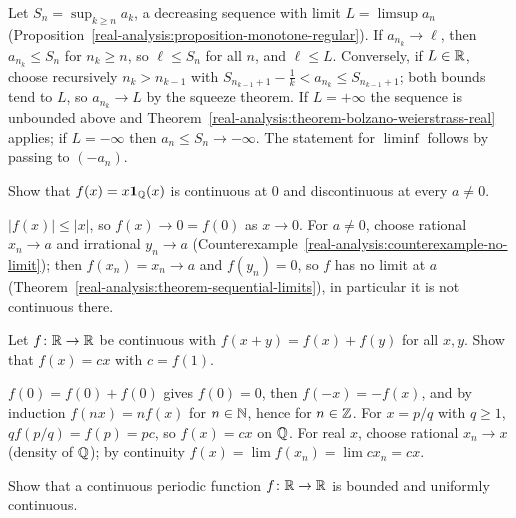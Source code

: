 \begin{solution}
Let $S_n = \sup_{k \geq n}a_k$, a decreasing sequence with limit $L = \limsup a_n$ (Proposition~\ref{real-analysis:proposition-monotone-regular}). If $a_{n_k} \to \ell$, then $a_{n_k} \leq S_n$ for $n_k \geq n$, so $\ell \leq S_n$ for
all $n$, and $\ell \leq L$. Conversely, if $L \in \mathbb{R}$, choose recursively $n_k > n_{k-1}$ with $S_{n_{k-1}+1} - \frac1k < a_{n_k} \leq S_{n_{k-1}+1}$; both bounds tend to $L$, so $a_{n_k} \to L$ by the squeeze theorem. If
$L = +\infty$ the sequence is unbounded above and Theorem~\ref{real-analysis:theorem-bolzano-weierstrass-real} applies; if $L = -\infty$ then $a_n \leq S_n \to -\infty$. The statement for $\liminf$ follows by passing to
$(-a_n)$.
\end{solution}

\begin{exercise}\label{real-analysis:exercise-continuous-one-point}
Show that $f(x) = x\mathbf{1}_{\mathbb{Q}}(x)$ is continuous at $0$ and discontinuous at every $a \neq 0$.
\end{exercise}

\begin{solution}
$|f(x)| \leq |x|$, so $f(x) \to 0 = f(0)$ as $x \to 0$. For $a \neq 0$, choose rational $x_n \to a$ and irrational $y_n \to a$ (Counterexample~\ref{real-analysis:counterexample-no-limit}); then $f(x_n) = x_n \to a$ and
$f(y_n) = 0$, so $f$ has no limit at $a$ (Theorem~\ref{real-analysis:theorem-sequential-limits}), in particular it is not continuous there.
\end{solution}

\begin{exercise}\label{real-analysis:exercise-cauchy-functional}
Let $f \colon \mathbb{R} \to \mathbb{R}$ be continuous with $f(x + y) = f(x) + f(y)$ for all $x, y$. Show that $f(x) = cx$ with $c = f(1)$.
\end{exercise}

\begin{solution}
$f(0) = f(0) + f(0)$ gives $f(0) = 0$, then $f(-x) = -f(x)$, and by induction $f(nx) = nf(x)$ for $n \in \mathbb{N}$, hence for $n \in \mathbb{Z}$. For $x = p/q$ with $q \geq 1$, $qf(p/q) = f(p) = pc$, so $f(x) = cx$ on $\mathbb{Q}$. For
real $x$, choose rational $x_n \to x$ (density of $\mathbb{Q}$); by continuity $f(x) = \lim f(x_n) = \lim cx_n = cx$.
\end{solution}

\begin{exercise}\label{real-analysis:exercise-periodic-uniform}
Show that a continuous periodic function $f \colon \mathbb{R} \to \mathbb{R}$ is bounded and uniformly continuous.
\end{exercise}

